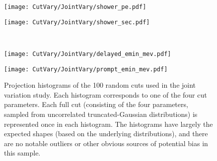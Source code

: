 \documentclass[../thesis.tex]{subfiles}
\begin{document}
\begin{figure}[h]
  \begin{minipage}{0.5\linewidth}%
    \texttt{[image: CutVary/JointVary/shower\_pe.pdf]}%
  \end{minipage}%
  \begin{minipage}{0.5\linewidth}%
    \texttt{[image: CutVary/JointVary/shower\_sec.pdf]}%
  \end{minipage}\\%
  \begin{minipage}{0.5\linewidth}%
    \texttt{[image: CutVary/JointVary/delayed\_emin\_mev.pdf]}%
  \end{minipage}%
  \begin{minipage}{0.5\linewidth}%
    \texttt{[image: CutVary/JointVary/prompt\_emin\_mev.pdf]}%
  \end{minipage}%
  \caption{Projection histograms of the 100 random cuts used in the joint variation study. Each histogram corresponds to one of the four cut parameters. Each full cut (consisting of the four parameters, sampled from uncorrelated truncated-Gaussian distributions) is represented once in each histogram. The histograms have largely the expected shapes (based on the underlying distributions), and there are no notable outliers or other obvious sources of potential bias in this sample.}
  \label{fig:cutVaryJointVaryCutHists}
\end{figure}
\end{document}
